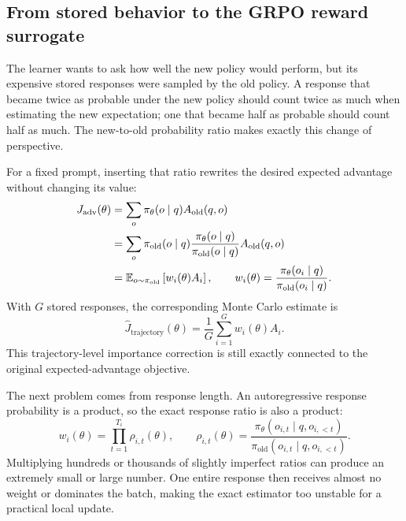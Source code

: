 \subsection{From stored behavior to the GRPO reward surrogate}
\label{subsec:grpo-importance-ratio}

The learner wants to ask how well the new policy would perform, but its expensive stored
responses were sampled by the old policy. A response that became twice as probable under
the new policy should count twice as much when estimating the new expectation; one that
became half as probable should count half as much. The new-to-old probability ratio makes
exactly this change of perspective.

For a fixed prompt, inserting that ratio rewrites the desired expected advantage without
changing its value:
\begin{align}
  J_{\mathrm{adv}}(\theta)
  &=\sum_o \pi_\theta(o\mid q)A_{\mathrm{old}}(q,o) \notag\\
  &=\sum_o \pi_{\mathrm{old}}(o\mid q)
    \frac{\pi_\theta(o\mid q)}{\pi_{\mathrm{old}}(o\mid q)}
    A_{\mathrm{old}}(q,o) \notag\\
  &=\mathbb{E}_{o\sim\pi_{\mathrm{old}}}
    \left[w_i(\theta)A_i\right],
  \qquad
  w_i(\theta)=\frac{\pi_\theta(o_i\mid q)}
                    {\pi_{\mathrm{old}}(o_i\mid q)}.
  \label{eq:grpo-trajectory-importance-expectation}
\end{align}
With $G$ stored responses, the corresponding Monte Carlo estimate is
\begin{equation}
  \widehat J_{\mathrm{trajectory}}(\theta)
  =\frac{1}{G}\sum_{i=1}^{G}w_i(\theta)A_i.
  \label{eq:grpo-trajectory-importance-estimator}
\end{equation}
This trajectory-level importance correction is still exactly connected to the original
expected-advantage objective.

The next problem comes from response length. An autoregressive response probability is a
product, so the exact response ratio is also a product:
\begin{equation}
  w_i(\theta)
  =\prod_{t=1}^{T_i}\rho_{i,t}(\theta),
  \qquad
  \rho_{i,t}(\theta)
  =\frac{\pi_\theta(o_{i,t}\mid q,o_{i,<t})}
         {\pi_{\mathrm{old}}(o_{i,t}\mid q,o_{i,<t})}.
  \label{eq:grpo-complete-trajectory-ratio}
\end{equation}
Multiplying hundreds or thousands of slightly imperfect ratios can produce an extremely
small or large number. One entire response then receives almost no weight or dominates
the batch, making the exact estimator too unstable for a practical local update.

